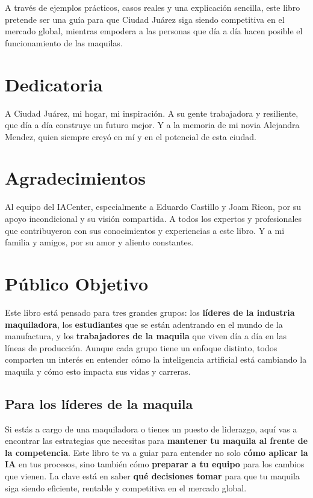 A través de ejemplos prácticos, casos reales y una explicación sencilla, este libro pretende ser una guía para que Ciudad Juárez siga siendo competitiva en el mercado global, mientras empodera a las personas que día a día hacen posible el funcionamiento de las maquilas.

\section{Dedicatoria}
A Ciudad Juárez, mi hogar, mi inspiración. A su gente trabajadora y resiliente, que día a día construye un futuro mejor. Y a la memoria de mi novia Alejandra Mendez, quien siempre creyó en mí y en el potencial de esta ciudad.

\section{Agradecimientos}
Al equipo del IACenter, especialmente a Eduardo Castillo y Joam Ricon, por su apoyo incondicional y su visión compartida. A todos los expertos y profesionales que contribuyeron con sus conocimientos y experiencias a este libro. Y a mi familia y amigos, por su amor y aliento constantes.

\section{Público Objetivo}
Este libro está pensado para tres grandes grupos: los \textbf{líderes de la industria maquiladora}, los \textbf{estudiantes} que se están adentrando en el mundo de la manufactura, y los \textbf{trabajadores de la maquila} que viven día a día en las líneas de producción. Aunque cada grupo tiene un enfoque distinto, todos comparten un interés en entender cómo la inteligencia artificial está cambiando la maquila y cómo esto impacta sus vidas y carreras.

\subsection{Para los líderes de la maquila}
Si estás a cargo de una maquiladora o tienes un puesto de liderazgo, aquí vas a encontrar las estrategias que necesitas para \textbf{mantener tu maquila al frente de la competencia}. Este libro te va a guiar para entender no solo \textbf{cómo aplicar la IA} en tus procesos, sino también cómo \textbf{preparar a tu equipo} para los cambios que vienen. La clave está en saber \textbf{qué decisiones tomar} para que tu maquila siga siendo eficiente, rentable y competitiva en el mercado global.

